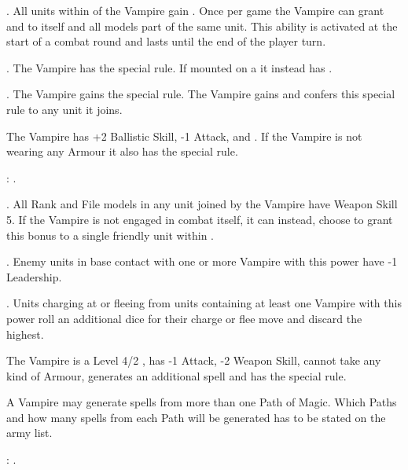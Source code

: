 \startpricelist

 \textbf{\ancientbloodpower}. All units within  of the Vampire gain \newrule{\hardtarget{}}. Once per game the Vampire can grant \lightningattacks{} and  to itself and all models part of the same unit. This ability is activated at the start of a combat round and lasts until the end of the player turn.

 \textbf{\bloodlinepower}. The Vampire has the  special rule. If mounted on a \largetarget{} it instead has .

 \textbf{\bloodlinepower}. The Vampire gains the \awaken{\zombies , \direwolves , \batswarms , \greatbats} special rule. The Vampire gains \swiftstride{} and confers this special rule to any unit it joins.

\endpricelist

\separator


\noindent\parbox{\columnwidth}{
The Vampire has +2 Ballistic Skill, -1 Attack, \lightningreflexes{} and \throwingweapons{}. If the Vampire is not wearing any Armour it also has the \distracting{} special rule.

\bloodties{}: \courtofthedamned{}.
}

\startpricelist

 \textbf{\ancientbloodpower}. All Rank and File models in any unit joined by the Vampire have Weapon Skill 5. If the Vampire is not engaged in combat itself, it can instead,  choose to grant this bonus to a single friendly unit within .

 \textbf{\bloodlinepower}. Enemy units in base contact with one or more Vampire with this power have -1 Leadership.

 \textbf{\bloodlinepower}. Units charging at or fleeing from units containing at least one Vampire with this power roll an additional dice for their charge or flee move and discard the highest.

\endpricelist


\noindent\parbox{\columnwidth}{
The Vampire is a Level 4/2 \wizard{}, has -1 Attack, -2 Weapon Skill, cannot take any kind of Armour, generates an additional spell and has the \awaken{\zombies , \skeletons} special rule.

A \nosferatu{} Vampire may generate spells from more than one Path of Magic. Which Paths and how many spells from each Path will be generated has to be stated on the army list.

\bloodties{}: \wraiths{}.
}

